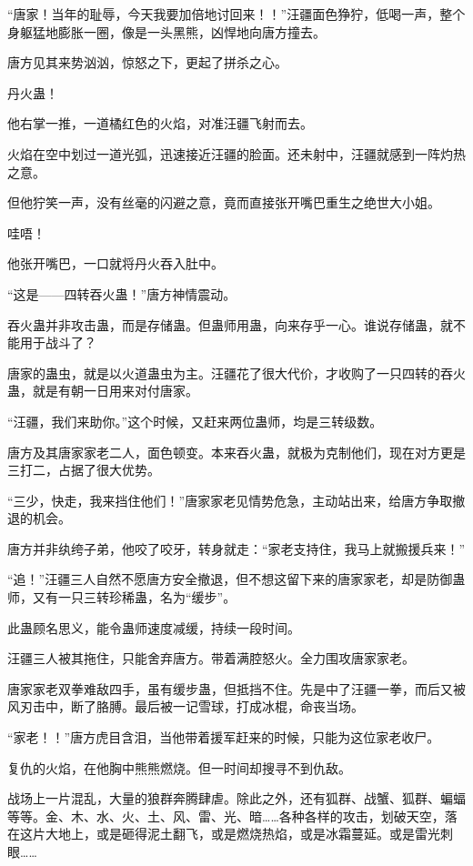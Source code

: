 
\begin{this_body}



“唐家！当年的耻辱，今天我要加倍地讨回来！！”汪疆面色狰狞，低喝一声，整个身躯猛地膨胀一圈，像是一头黑熊，凶悍地向唐方撞去。

唐方见其来势汹汹，惊怒之下，更起了拼杀之心。

丹火蛊！

他右掌一推，一道橘红色的火焰，对准汪疆飞射而去。

火焰在空中划过一道光弧，迅速接近汪疆的脸面。还未射中，汪疆就感到一阵灼热之意。

但他狞笑一声，没有丝毫的闪避之意，竟而直接张开嘴巴重生之绝世大小姐。

哇唔！

他张开嘴巴，一口就将丹火吞入肚中。

“这是——四转吞火蛊！”唐方神情震动。

吞火蛊并非攻击蛊，而是存储蛊。但蛊师用蛊，向来存乎一心。谁说存储蛊，就不能用于战斗了？

唐家的蛊虫，就是以火道蛊虫为主。汪疆花了很大代价，才收购了一只四转的吞火蛊，就是有朝一日用来对付唐家。

“汪疆，我们来助你。”这个时候，又赶来两位蛊师，均是三转级数。

唐方及其唐家家老二人，面色顿变。本来吞火蛊，就极为克制他们，现在对方更是三打二，占据了很大优势。

“三少，快走，我来挡住他们！”唐家家老见情势危急，主动站出来，给唐方争取撤退的机会。

唐方并非纨绔子弟，他咬了咬牙，转身就走：“家老支持住，我马上就搬援兵来！”

“追！”汪疆三人自然不愿唐方安全撤退，但不想这留下来的唐家家老，却是防御蛊师，又有一只三转珍稀蛊，名为“缓步”。

此蛊顾名思义，能令蛊师速度减缓，持续一段时间。

汪疆三人被其拖住，只能舍弃唐方。带着满腔怒火。全力围攻唐家家老。

唐家家老双拳难敌四手，虽有缓步蛊，但抵挡不住。先是中了汪疆一拳，而后又被风刃击中，断了胳膊。最后被一记雪球，打成冰棍，命丧当场。

“家老！！”唐方虎目含泪，当他带着援军赶来的时候，只能为这位家老收尸。

复仇的火焰，在他胸中熊熊燃烧。但一时间却搜寻不到仇敌。

战场上一片混乱，大量的狼群奔腾肆虐。除此之外，还有狐群、战蟹、狐群、蝙蝠等等。金、木、水、火、土、风、雷、光、暗……各种各样的攻击，划破天空，落在这片大地上，或是砸得泥土翻飞，或是燃烧热焰，或是冰霜蔓延。或是雷光刺眼……


\end{this_body}
